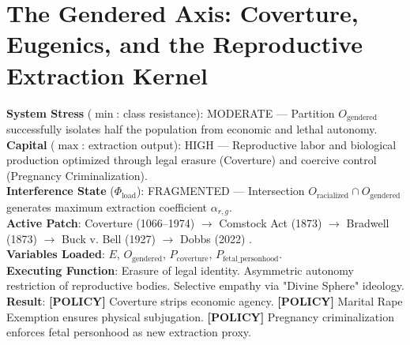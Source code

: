 \chapter{The Gendered Axis: Coverture, Eugenics, and the Reproductive Extraction Kernel}
\label{ch:gendered}

\begin{tcolorbox}[colback=black!5, colframe=black!70, fonttitle=\bfseries\ttfamily, title=RUNTIME LOG: GENDERED AXIS (FOUNDATIONAL -- PRESENT)]
\ttfamily\small
\textbf{System Stress} ($\min$: class resistance): MODERATE --- Partition $O_{\text{gendered}}$ successfully isolates half the population from economic and lethal autonomy.\\
\textbf{Capital} ($\max$: extraction output): HIGH --- Reproductive labor and biological production optimized through legal erasure (Coverture) and coercive control (Pregnancy Criminalization).\\
\textbf{Interference State} ($\Phi_{\text{load}}$): FRAGMENTED --- Intersection $O_{\text{racialized}} \cap O_{\text{gendered}}$ generates maximum extraction coefficient $\alpha_{r,g}$.\\
\textbf{Active Patch}: Coverture (1066--1974) $\rightarrow$ Comstock Act (1873) $\rightarrow$ Bradwell (1873) $\rightarrow$ Buck v. Bell (1927) $\rightarrow$ Dobbs (2022) \cite{dobbs}.\\
\textbf{Variables Loaded}: $E$, $O_{\text{gendered}}$, $P_{\text{coverture}}$, $P_{\text{fetal\_personhood}}$.\\
\textbf{Executing Function}: Erasure of legal identity. Asymmetric autonomy restriction of reproductive bodies. Selective empathy via "Divine Sphere" ideology.\\
\textbf{Result}: \textbf{[POLICY]} Coverture strips economic agency. \textbf{[POLICY]} Marital Rape Exemption ensures physical subjugation. \textbf{[POLICY]} Pregnancy criminalization enforces fetal personhood as new extraction proxy.
\end{tcolorbox}

\medskip

